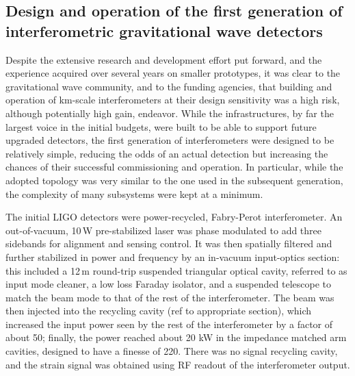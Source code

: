 \subsection{Design and operation of the first generation of interferometric gravitational wave detectors}\label{subsec:1stgen}

Despite the extensive research and development effort put forward, and the experience acquired over several years on smaller prototypes, it was clear to the gravitational wave community, and to the funding agencies, that building and operation of km-scale interferometers at their design sensitivity was a high risk, although potentially high gain, endeavor. While the infrastructures, by far the largest voice in the initial budgets, were built to be able to support future upgraded detectors, the first generation of interferometers were designed to be relatively simple, reducing the odds of an actual detection but increasing the chances of their successful commissioning and operation. In particular, while the adopted topology was very similar to the one used in the subsequent generation, the complexity of many subsystems were kept at a minimum.

The initial LIGO detectors were power-recycled, Fabry-Perot interferometer. An out-of-vacuum, 10\,W pre-stabilized laser was phase modulated to add three sidebands for alignment and sensing control. It was then spatially filtered and further stabilized in power and frequency by an in-vacuum input-optics section: this included a 12\,m round-trip suspended triangular optical cavity, referred to as input mode cleaner, a low loss Faraday isolator, and a suspended telescope to match the beam mode to that of the rest of the interferometer. The beam was then injected into the recycling cavity (ref to appropriate section), which increased the input power seen by the rest of the interferometer by a factor of about 50; finally, the power reached about 20 kW in the impedance matched arm cavities, designed to have a finesse of 220. There was no signal recycling cavity, and the strain signal was obtained using RF readout of the interferometer output.

